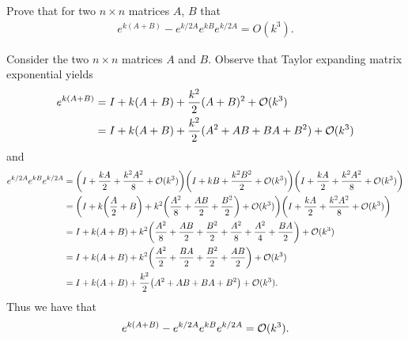 \documentclass[12pt]{report}
\begin{document}

\begin{problem}
    Prove that for two $n \times n$ matrices $A$, $B$ that
  \begin{align*}
    e^{k(A+B)} - e^{k/2 A}e^{k B}e^{k/2 A} = O(k^3).
  \end{align*}
\end{problem}

\begin{solution}

    \noindent
    Consider the two $n \times n$ matrices $A$ and $B$. Observe that Taylor expanding matrix exponential yields
    \begin{align*}
        e^{k(A+B)} &= I + k(A+B) + \frac{k^2}{2}(A+B)^2 + {\mathcal{O}}(k^3)\\
        &= I + k(A+B) + \frac{k^2}{2}(A^2+AB+BA+B^2) + {\mathcal{O}}(k^3)
    \end{align*}
    and
    \begin{align*}
        e^{k/2A}  e^{k B} e^{k/2 A} &= {\left(I + \frac{kA}{2} + \frac{k^2A^2}{8} + {\mathcal{O}}(k^3)\right)}{\left(I + kB + \frac{k^2B^2}{2} + {\mathcal{O}}(k^3)\right)}{\left(I + \frac{kA}{2} + \frac{k^2A^2}{8} + {\mathcal{O}}(k^3)\right)}\\
        &={\left(I + k{\left(\frac{A}{2} + B\right)} + k^2{\left(\frac{A^2}{8} + \frac{AB}{2} + \frac{B^2}{2}\right)} + {\mathcal{O}} (k^3)\right)}{\left(I + \frac{kA}{2} + \frac{k^2A^2}{8} + {\mathcal{O}}(k^3)\right)}\\
        &=I + k{\left(A + B\right)} + k^2{\left(\frac{A^2}{8} + \frac{AB}{2} + \frac{B^2}{2} + \frac{A^2}{8} + \frac{A^2}{4} + \frac{BA}{2}\right)} +{\mathcal{O}} (k^3)\\
        &=I + k{\left(A + B\right)} + k^2{\left(\frac{A^2}{2} + \frac{BA}{2} + \frac{B^2}{2} + \frac{AB}{2}\right)} +{\mathcal{O}} (k^3)\\
        &=I + k{\left(A + B\right)} + \frac{k^2}{2}{\left(A^2 + AB + BA + B^2\right)} +{\mathcal{O}} (k^3).\\
    \end{align*}
    Thus we have that
    \[ 
        e^{k(A+B)} - e^{k/2A}  e^{k B} e^{k/2 A} = {\mathcal{O}}(k^3).
    \]

\end{solution}

\newpage


\end{document}
